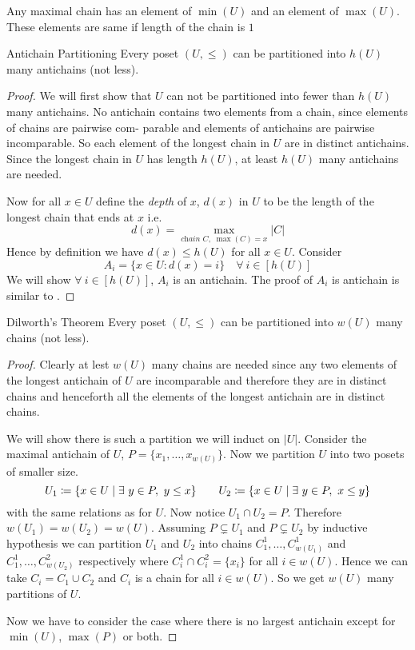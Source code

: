 \begin{lemma}{}{}
	Any maximal chain has an element of $\min(U)$ and an element of $\max(U)$. These elements are same if length of the chain is $1$
\end{lemma}
\begin{Theorem}{Antichain Partitioning}{}
	Every poset $(U,\leq )$ can be partitioned into $h(U)$ many antichains (not less). 
\end{Theorem}
\begin{proof}
	We will first show that $U$ can not be partitioned into fewer than $h(U)$ many antichains. No antichain contains two elements from a chain,  since elements of chains are pairwise com-
	parable and elements of antichains are pairwise incomparable. So each element of the longest chain in $U$ are in distinct antichains. Since the longest chain in $U$ has length $h(U)$, at least $h(U)$ many antichains are needed.
	
	Now for all $x\in U$ define the \textit{depth} of $x$, $d(x)$ in $U$ to be the length of the longest chain that ends at $x$ i.e. $$d(x)=\max\limits_{\textit{chain $C$},\; \max(C)=x}|C|$$Hence by definition we have $d(x)\leq h(U)$ for all $x\in U$. Consider $$A_i=\{x\in U\colon d(x)=i\}\quad\forall\ i\in[h(U)]$$We will show $\forall\ i\in[h(U)]$, $A_i$ is an antichain. The proof of $A_i$ is antichain is similar to .
\end{proof}
\begin{Theorem}{Dilworth's Theorem}{}
	Every poset $(U,\leq)$ can be partitioned into $w(U)$ many chains (not less).
\end{Theorem}
\begin{proof}
	Clearly at lest $w(U)$ many chains are needed since any two elements of the longest antichain of $U$ are incomparable and therefore they are in distinct chains and henceforth all the elements of the longest antichain are in distinct chains.
	
	We will show there is such a partition we will induct on $|U|$. Consider the maximal antichain of $U$, $P=\{x_1,\dots, x_{w(U)}\}$. Now we partition $U$ into two posets of smaller size.$$U_1\coloneqq \{x\in U\mid \exists\ y\in P,\ y\leq x\}\qquad U_2\coloneqq \{x\in U\mid \exists\ y\in P,\ x\leq y\}$$ with the same relations as for $U$. Now notice $U_1\cap U_2=P$. Therefore $w(U_1)=w(U_2)=w(U)$. Assuming $P\subsetneq U_1$ and $P\subsetneq U_2$ by inductive hypothesis we can partition $U_1$ and $U_2$ into chains $C^1_1,\dots, C_{w(U_1)}^1$ and $C_1^1,\dots, C_{w(U_2)}^2$ respectively where $C_i^1\cap C_i^2=\{x_i\}$ for all $i\in w(U)$. Hence we can take $C_i=C_1\cup C_2$ and $C_i$ is a chain for all $i\in w(U)$. So we get $w(U)$ many partitions of $U$.
	
	Now we have to consider the case where  there is no largest antichain except for $\min(U )$, $\max(P )$ or both.
\end{proof}